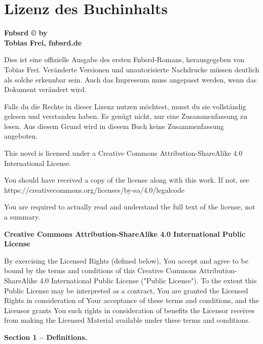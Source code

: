 \chapter{Lizenz des Buchinhalts}

\textbf{Fnbsrd © by\\ Tobias Frei, fnbsrd.de}

Dies ist eine offizielle Ausgabe des ersten Fnbsrd-Romans, herausgegeben von Tobias Frei. Veränderte Versionen und unautorisierte Nachdrucke müssen deutlich als solche erkennbar sein. Auch das Impressum muss angepasst werden, wenn das Dokument verändert wird.

Falls du die Rechte in dieser Lizenz nutzen möchtest, musst du sie vollständig gelesen und verstanden haben. Es genügt nicht, nur eine Zusammenfassung zu lesen. Aus diesem Grund wird in diesem Buch keine Zusammenfassung angeboten.

This novel is licensed under a Creative Commons Attribution-ShareAlike 4.0 International License.

You should have received a copy of the license along with this work. If not, see\\
https://creativecommons.org/licenses/by-sa/4.0/legalcode

You are required to actually read and understand the full text of the license, not a summary.

\begin{center}
    \large{\textbf{Creative Commons Attribution-ShareAlike 4.0 International Public License}}
\end{center}

By exercising the Licensed Rights (defined below), You accept and agree to be bound by the terms and conditions of this Creative Commons Attribution-ShareAlike 4.0 International Public License ("Public License"). To the extent this Public License may be interpreted as a contract, You are granted the Licensed Rights in consideration of Your acceptance of these terms and conditions, and the Licensor grants You such rights in consideration of benefits the Licensor receives from making the Licensed Material available under these terms and conditions.

\begin{center}
    \textbf{Section 1 -- Definitions.}
\end{center}

